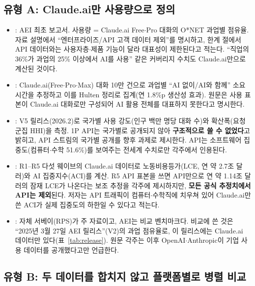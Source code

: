 \documentclass[11pt]{article}
\begin{document}
\subsection{유형 A: Claude.ai만 사용량으로 정의}

\begin{itemize}
  \item \textbf{\textcite{handa-2025-which-economic-tasks-are}}: AEI 최초 보고서. 사용량 = Claude.ai Free$\cdot$Pro 대화의 O*NET 과업별 점유율. 자료 설명에서 ``엔터프라이즈/API 고객 데이터 제외''를 명시하고, 한계 절에서 API 데이터와는 사용자층$\cdot$제품 기능이 달라 대표성이 제한된다고 적는다. ``직업의 36\%가 과업의 25\% 이상에서 AI를 사용'' 같은 커버리지 수치도 Claude.ai만으로 계산된 것이다.
  \item \textbf{\textcite{tamkin-2025-estimating-ai-productivity-gains-from}}: Claude.ai(Free$\cdot$Pro$\cdot$Max) 대화 10만 건으로 과업별 ``AI 없이/AI와 함께'' 소요시간을 추정하고 이를 Hulten 정리로 집계(연 1.8\%p 생산성 효과). 원문은 사용 표본이 Claude.ai 대화로만 구성되어 AI 활용 전체를 대표하지 못한다고 명시한다.
  \item \textbf{\textcite{fan-2026-what-countries-use-ai-and}}: V5 릴리스(2026.2)로 국가별 사용 강도(인구 백만 명당 대화 수)와 확산폭(요청군집 HHI)을 측정. 1P API는 국가별로 공개되지 않아 \textbf{구조적으로 쓸 수 없었다}고 밝히고, API 스트림의 국가별 공개를 향후 과제로 제시한다. API는 소프트웨어 집중도(컴퓨터$\cdot$수학 51.6\%)를 보여주는 전세계 수치로만 각주에서 인용된다.
  \item \textbf{\textcite{fan-2026-aggregate-gains-from-ai}}: R1--R5 다섯 웨이브의 Claude.ai 데이터로 노동비용등가(LCE, 연 약 2.7조 달러)와 AI 집중지수(ACI)를 계산. R5 API 표본을 쓰면 API만으로 연 약 1.14조 달러의 잠재 LCE가 나온다는 보조 추정을 각주에 제시하지만, \textbf{모든 공식 추정치에서 API는 제외}된다. 저자는 API 트래픽이 컴퓨터$\cdot$수학직에 치우쳐 있어 Claude.ai만 쓴 ACI가 실제 집중도의 하한일 수 있다고 적는다.
  \item \textbf{\textcite{bick-2026-what-work-does-generative}}: 자체 서베이(RPS)가 주 자료이고, AEI는 비교 벤치마크다. 비교에 쓴 것은 ``2025년 3월 27일 AEI 릴리스''(V2)의 과업 점유율로, 이 릴리스에는 Claude.ai 데이터만 있다(표~\ref{tab:release}). 원문 각주는 이후 OpenAI$\cdot$Anthropic이 기업 사용 데이터를 공개했다고만 언급한다.
\end{itemize}

\subsection{유형 B: 두 데이터를 합치지 않고 플랫폼별로 병렬 비교}
\end{document}
